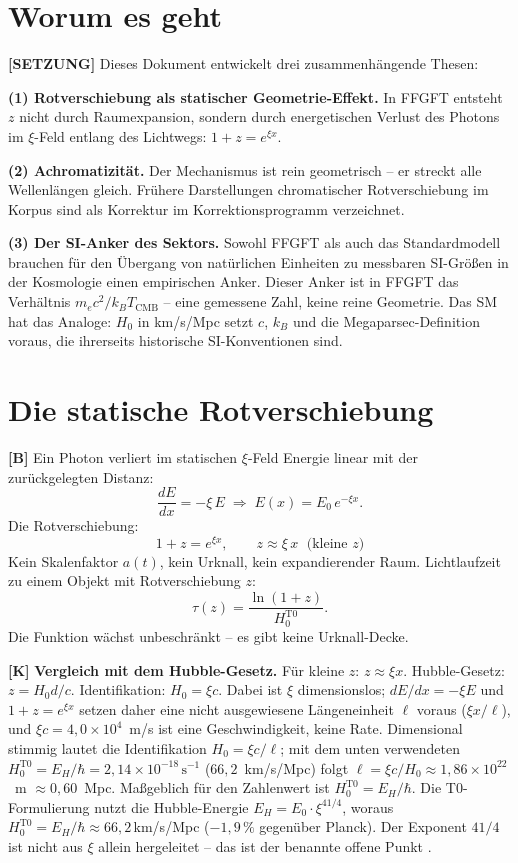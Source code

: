\section{Worum es geht}

\textbf{[SETZUNG]} Dieses Dokument entwickelt drei zusammenhängende Thesen:

\textbf{(1) Rotverschiebung als statischer Geometrie-Effekt.} In FFGFT entsteht
$z$ nicht durch Raumexpansion, sondern durch energetischen Verlust des Photons im
$\xi$-Feld entlang des Lichtwegs: $1+z=e^{\xi x}$.

\textbf{(2) Achromatizität.} Der Mechanismus ist rein geometrisch -- er streckt
alle Wellenlängen gleich. Frühere Darstellungen chromatischer Rotverschiebung im
Korpus sind als Korrektur im Korrektionsprogramm verzeichnet.

\textbf{(3) Der SI-Anker des Sektors.} Sowohl FFGFT als auch das Standardmodell
brauchen für den Übergang von natürlichen Einheiten zu messbaren SI-Größen in der
Kosmologie einen empirischen Anker. Dieser Anker ist in FFGFT das Verhältnis
$m_ec^2/k_BT_\text{CMB}$ -- eine gemessene Zahl, keine reine Geometrie. Das SM
hat das Analoge: $H_0$ in km/s/Mpc setzt $c$, $k_B$ und die Megaparsec-Definition
voraus, die ihrerseits historische SI-Konventionen sind.

\section{Die statische Rotverschiebung}

\textbf{[B]} Ein Photon verliert im statischen $\xi$-Feld Energie linear mit der
zurückgelegten Distanz:
\[
  \frac{dE}{dx} = -\xi\,E
  \;\Rightarrow\;
  E(x) = E_0\,e^{-\xi x}.
\]
Die Rotverschiebung:
\[
  \boxed{\;1+z = e^{\xi x},\qquad z\approx\xi\,x\;\text{ (kleine }z\text{)}\;}
\]
Kein Skalenfaktor $a(t)$, kein Urknall, kein expandierender Raum. Lichtlaufzeit
zu einem Objekt mit Rotverschiebung $z$:
\[
  \tau(z) = \frac{\ln(1+z)}{H_0^\text{T0}}.
\]
Die Funktion wächst unbeschränkt -- es gibt keine Urknall-Decke.

\textbf{[K]} \textbf{Vergleich mit dem Hubble-Gesetz.} Für kleine $z$: $z\approx\xi x$.
Hubble-Gesetz: $z=H_0 d/c$. Identifikation: $H_0=\xi c$. Dabei ist $\xi$ dimensionslos; $dE/dx=-\xi E$ und $1+z=e^{\xi x}$ setzen daher eine nicht ausgewiesene Längeneinheit $\ell$ voraus ($\xi x/\ell$), und $\xi c = 4{,}0\times10^{4}$~m/s ist eine Geschwindigkeit, keine Rate. Dimensional stimmig lautet die Identifikation $H_0=\xi c/\ell$; mit dem unten verwendeten $H_0^\text{T0}=E_H/\hbar = 2{,}14\times10^{-18}\,\text{s}^{-1}$ ($66{,}2$~km/s/Mpc) folgt $\ell = \xi c/H_0 \approx 1{,}86\times10^{22}$~m $\approx 0{,}60$~Mpc. Maßgeblich für den Zahlenwert ist $H_0^\text{T0}=E_H/\hbar$. Die T0-Formulierung
nutzt die Hubble-Energie $E_H=E_0\cdot\xi^{41/4}$, woraus $H_0^\text{T0}=E_H/\hbar\approx66{,}2\,$km/s/Mpc
($-1{,}9\,\%$ gegenüber Planck). Der Exponent $41/4$ ist nicht aus $\xi$ allein
hergeleitet -- das ist der benannte offene Punkt .

